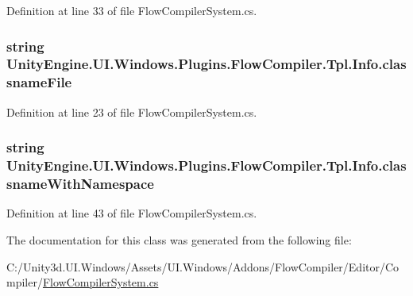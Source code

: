 Definition at line 33 of file Flow\+Compiler\+System.\+cs.

\hypertarget{class_unity_engine_1_1_u_i_1_1_windows_1_1_plugins_1_1_flow_compiler_1_1_tpl_1_1_info_a2d170b46d8345327e32bae0c264c4536}{}
\subsubsection[{classname\+File}]{\setlength{\rightskip}{0pt plus 5cm}string Unity\+Engine.\+U\+I.\+Windows.\+Plugins.\+Flow\+Compiler.\+Tpl.\+Info.\+classname\+File\hspace{0.3cm}{\ttfamily [get]}}\label{class_unity_engine_1_1_u_i_1_1_windows_1_1_plugins_1_1_flow_compiler_1_1_tpl_1_1_info_a2d170b46d8345327e32bae0c264c4536}


Definition at line 23 of file Flow\+Compiler\+System.\+cs.

\hypertarget{class_unity_engine_1_1_u_i_1_1_windows_1_1_plugins_1_1_flow_compiler_1_1_tpl_1_1_info_a8b9894f34390b15747ebcdbda3a84f86}{}
\subsubsection[{classname\+With\+Namespace}]{\setlength{\rightskip}{0pt plus 5cm}string Unity\+Engine.\+U\+I.\+Windows.\+Plugins.\+Flow\+Compiler.\+Tpl.\+Info.\+classname\+With\+Namespace\hspace{0.3cm}{\ttfamily [get]}}\label{class_unity_engine_1_1_u_i_1_1_windows_1_1_plugins_1_1_flow_compiler_1_1_tpl_1_1_info_a8b9894f34390b15747ebcdbda3a84f86}


Definition at line 43 of file Flow\+Compiler\+System.\+cs.



The documentation for this class was generated from the following file\+:\begin{DoxyCompactItemize}
\item 
C\+:/\+Unity3d.\+U\+I.\+Windows/\+Assets/\+U\+I.\+Windows/\+Addons/\+Flow\+Compiler/\+Editor/\+Compiler/\hyperlink{_flow_compiler_system_8cs}{Flow\+Compiler\+System.\+cs}\end{DoxyCompactItemize}
